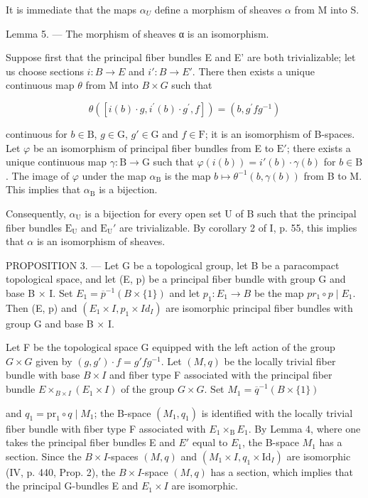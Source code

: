 It is immediate that the maps \(\alpha_{U}\) define a morphism of sheaves \(\alpha\) from M into S.

Lemma 5. --- The morphism of sheaves α is an isomorphism.

Suppose first that the principal fiber bundles E and E' are both trivializable; let us choose sections \(i: B \to E\) and \(i': B \to E'\). There then exists a unique continuous map \(\theta\) from M into \(B \times G\) such that

\[
\theta ([ i (b) \cdot g, i ^ {\prime} (b) \cdot g ^ {\prime}, f ]) = (b, g ^ {\prime} f g ^ {- 1})
\]

continuous for \(b \in \mathrm{B}\), \(g \in \mathrm{G}\), \(g' \in \mathrm{G}\) and \(f \in \mathrm{F}\); it is an isomorphism of B-spaces. Let \(\varphi\) be an isomorphism of principal fiber bundles from E to \(\mathrm{E}'\); there exists a unique continuous map \(\gamma: \mathrm{B} \to \mathrm{G}\) such that \(\varphi(i(b)) = i'(b) \cdot \gamma(b)\) for \(b \in \mathrm{B}\). The image of \(\varphi\) under the map \(\alpha_{\mathrm{B}}\) is the map \(b \mapsto \theta^{-1}(b, \gamma(b))\) from B to M. This implies that \(\alpha_{\mathrm{B}}\) is a bijection.

Consequently, \(\alpha_{\mathrm{U}}\) is a bijection for every open set U of B such that the principal fiber bundles \(\mathrm{E_U}\) and \(\mathrm{E_U}'\) are trivializable. By corollary 2 of I, p. 55, this implies that \(\alpha\) is an isomorphism of sheaves.

PROPOSITION 3. --- Let G be a topological group, let B be a paracompact topological space, and let (E, p) be a principal fiber bundle with group G and base B × I. Set \(E_{1} = \overline{p}^{-1}(B \times \{1\})\) and let \(p_{1}: E_{1} \to B\) be the map \(pr_{1} \circ p \mid E_{1}\). Then (E, p) and \((E_{1} \times I, p_{1} \times Id_{I})\) are isomorphic principal fiber bundles with group G and base B × I.

Let F be the topological space G equipped with the left action of the group \(G \times G\) given by \((g, g') \cdot f = g' fg^{-1}\). Let \((M, q)\) be the locally trivial fiber bundle with base \(B \times I\) and fiber type F associated with the principal fiber bundle \(E \times_{B \times I}(E_1 \times I)\) of the group \(G \times G\). Set \(M_1 = \overline{q}^{-1}(B \times \{1\})\)

and \(q_1 = \mathrm{pr}_1 \circ q \mid M_1\); the B-space \((M_1, q_1)\) is identified with the locally trivial fiber bundle with fiber type F associated with \(E_1 \times_\mathrm{B} E_1\). By Lemma 4, where one takes the principal fiber bundles E and \(E'\) equal to \(E_1\), the B-space \(M_1\) has a section. Since the \(B \times I\)-spaces \((M, q)\) and \((M_1 \times I, q_1 \times \mathrm{Id}_{I})\) are isomorphic (IV, p. 440, Prop. 2), the \(B \times I\)-space \((M, q)\) has a section, which implies that the principal G-bundles E and \(E_1 \times I\) are isomorphic.

